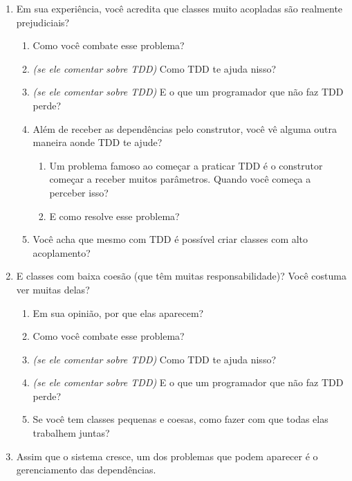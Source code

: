 \begin{enumerate}
	\item{Em sua experiência, você acredita que classes muito acopladas são realmente prejudiciais?}
		\begin{enumerate}
			\item Como você combate esse problema?

			\item \textit{(se ele comentar sobre TDD)} Como TDD te ajuda nisso?

			\item \textit{(se ele comentar sobre TDD)} E o que um programador que não faz
			TDD perde?
			
			\item Além de receber as dependências pelo construtor, você vê alguma outra
			maneira aonde TDD te ajude?
				\begin{enumerate}
					\item Um problema famoso ao começar a praticar TDD é o construtor começar a
					receber muitos parâmetros. Quando você começa a perceber isso?
					\item E como resolve esse problema?
				\end{enumerate}

			\item Você acha que mesmo com TDD é possível criar classes com alto acoplamento? 
		\end{enumerate}

	\item{E classes com baixa coesão (que têm muitas responsabilidade)? Você
	costuma ver muitas delas?}
		\begin{enumerate}
			\item Em sua opinião, por que elas aparecem?

			\item Como você combate esse problema?

			\item \textit{(se ele comentar sobre TDD)} Como TDD te ajuda nisso?
			
			\item \textit{(se ele comentar sobre TDD)} E o que um programador que não faz TDD
			perde?

			\item Se você tem classes pequenas e coesas, como fazer com que todas elas
			trabalhem juntas?
		\end{enumerate}

	\item Assim que o sistema cresce, um dos problemas que podem aparecer é o
	gerenciamento das dependências.
		

\end{enumerate}
